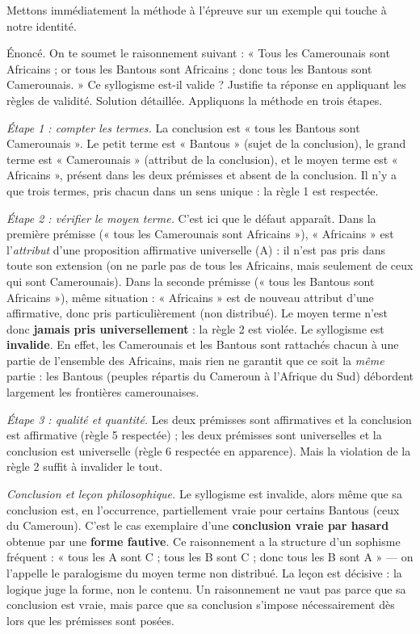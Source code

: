 \documentclass[11pt]{article}
\newcounter{popsec}
\newcounter{popsub}
\newcommand{\courssub}[1]{%
  \stepcounter{popsub}%
  \par\vspace{9pt}\noindent{\popxbold\fontsize{11.5}{13}\selectfont\color{popink}{\color{poporange}\thepopsec.\thepopsub}\hspace{6pt}#1}\par\nopagebreak\vspace{4pt}
}
\begin{document}
\courssub{Application : analyser un syllogisme fautif}

Mettons immédiatement la méthode à l'épreuve sur un exemple qui touche à notre identité.

\begin{exoresolu}
Énoncé. On te soumet le raisonnement suivant : « Tous les Camerounais sont Africains ; or tous les Bantous sont Africains ; donc tous les Bantous sont Camerounais. » Ce syllogisme est-il valide ? Justifie ta réponse en appliquant les règles de validité.
\tcblower
Solution détaillée. Appliquons la méthode en trois étapes.

\emph{Étape 1 : compter les termes.} La conclusion est « tous les Bantous sont Camerounais ». Le petit terme est « Bantous » (sujet de la conclusion), le grand terme est « Camerounais » (attribut de la conclusion), et le moyen terme est « Africains », présent dans les deux prémisses et absent de la conclusion. Il n'y a que trois termes, pris chacun dans un sens unique : la règle 1 est respectée.

\emph{Étape 2 : vérifier le moyen terme.} C'est ici que le défaut apparaît. Dans la première prémisse (« tous les Camerounais sont Africains »), « Africains » est l'\emph{attribut} d'une proposition affirmative universelle (A) : il n'est pas pris dans toute son extension (on ne parle pas de tous les Africains, mais seulement de ceux qui sont Camerounais). Dans la seconde prémisse (« tous les Bantous sont Africains »), même situation : « Africains » est de nouveau attribut d'une affirmative, donc pris particulièrement (non distribué). Le moyen terme n'est donc \textbf{jamais pris universellement} : la règle 2 est violée. Le syllogisme est \textbf{invalide}. En effet, les Camerounais et les Bantous sont rattachés chacun à une partie de l'ensemble des Africains, mais rien ne garantit que ce soit la \emph{même} partie : les Bantous (peuples répartis du Cameroun à l'Afrique du Sud) débordent largement les frontières camerounaises.

\emph{Étape 3 : qualité et quantité.} Les deux prémisses sont affirmatives et la conclusion est affirmative (règle 5 respectée) ; les deux prémisses sont universelles et la conclusion est universelle (règle 6 respectée en apparence). Mais la violation de la règle 2 suffit à invalider le tout.

\emph{Conclusion et leçon philosophique.} Le syllogisme est invalide, alors même que sa conclusion est, en l'occurrence, partiellement vraie pour certains Bantous (ceux du Cameroun). C'est le cas exemplaire d'une \textbf{conclusion vraie par hasard} obtenue par une \textbf{forme fautive}. Ce raisonnement a la structure d'un sophisme fréquent : « tous les A sont C ; tous les B sont C ; donc tous les B sont A » — on l'appelle le paralogisme du moyen terme non distribué. La leçon est décisive : la logique juge la forme, non le contenu. Un raisonnement ne vaut pas parce que sa conclusion est vraie, mais parce que sa conclusion s'impose nécessairement dès lors que les prémisses sont posées.
\end{exoresolu}
\end{document}
